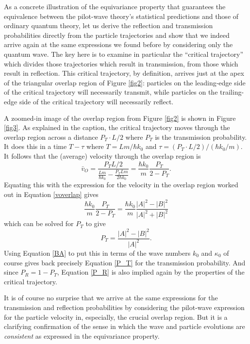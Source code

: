 \documentclass[aps,prc,twocolumn,letterpaper,floatfix]{revtex4}
\begin{document}
As a concrete illustration of the equivariance property that guarantees
the equivalence between the pilot-wave theory's statistical
predictions and those of ordinary quantum theory, let us derive the
reflection and transmission probabilities directly from the particle
trajectories and show that we indeed arrive again at the same
expressions we found before by considering only the quantum wave.  The
key here is to examine in particular the ``critical trajectory'' which
divides those trajectories which result in transmission, from those
which result in reflection.  This critical trajectory, by definition,
arrives just at the apex of the triangular overlap region of Figure
\ref{fig2}:  particles on the leading-edge side of the critical
trajectory will necessarily transmit, while particles on the
trailing-edge side of the critical trajectory will necessarily
reflect.  



A zoomed-in image of the overlap region from Figure \ref{fig2} is
shown in Figure \ref{fig3}.   As explained in the caption, the
critical trajectory moves through the overlap region across a distance 
$P_T\cdot L / 2$ where $P_T$ is the transmission probability.  It does
this in a time $T - \tau$ where $T = L m / \hbar k_0 $ and $\tau = (P_T
\cdot L / 2)/(\hbar k_0 /m)$.  It follows that the (average) velocity
through the overlap region is
\begin{equation}
\bar{v}_O = \frac{ P_T L / 2}{\frac{Lm}{\hbar k_0} - \frac{P_T L m}{2 \hbar
    k_0}} = \frac{\hbar k_0}{m} \frac{P_T}{2-P_T}.
\label{vOtraj}
\end{equation}
Equating this with the expression for the velocity in the overlap
region worked out in Equation \eqref{voverlap} gives
\begin{equation}
\frac{\hbar k_0}{m} \frac{P_T}{2-P_T} = \frac{\hbar k_0}{m} \frac{|A|^2 -
  |B|^2}{|A|^2 + |B|^2}
\end{equation}
which can be solved for $P_T$ to give
\begin{equation}
P_T = \frac{|A|^2 - |B|^2}{|A|^2}.
\end{equation}
Using Equation \eqref{BA} to put this in terms of the wave numbers
$k_0$ and $\kappa_0$ of course gives back precisely Equation \eqref{P_T} for the
transmission probability.  And since $P_R = 1-P_T$, 
Equation \eqref{P_R} is also implied again by the properties of the
critical trajectory.  

It is of course no surprise that we arrive at the same expressions for
the transmission and reflection probabilities by considering the
pilot-wave expression for the particle velocity in, especially, the
crucial overlap region.  But it is a clarifying confirmation of the
sense in which the wave and particle evolutions are \emph{consistent}
as expressed in the equivariance property.
\end{document}
